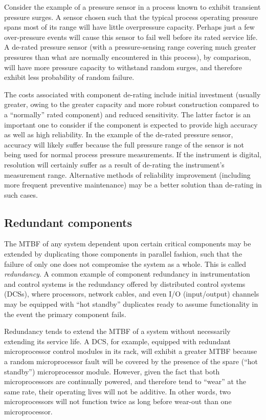 Consider the example of a pressure sensor in a process known to exhibit transient pressure surges.  A sensor chosen such that the typical process operating pressure spans most of its range will have little overpressure capacity.  Perhaps just a few over-pressure events will cause this sensor to fail well before its rated service life.  A de-rated pressure sensor (with a pressure-sensing range covering much greater pressures than what are normally encountered in this process), by comparison, will have more pressure capacity to withstand random surges, and therefore exhibit less probability of random failure.

The costs associated with component de-rating include initial investment (usually greater, owing to the greater capacity and more robust construction compared to a ``normally'' rated component) and reduced sensitivity.  The latter factor is an important one to consider if the component is expected to provide high accuracy as well as high reliability.  In the example of the de-rated pressure sensor, accuracy will likely suffer because the full pressure range of the sensor is not being used for normal process pressure measurements.  If the instrument is digital, resolution will certainly suffer as a result of de-rating the instrument's measurement range.  Alternative methods of reliability improvement (including more frequent preventive maintenance) may be a better solution than de-rating in such cases.






\filbreak
\subsection{Redundant components}

The MTBF of any system dependent upon certain critical components may be extended by duplicating those components in parallel fashion, such that the failure of only one does not compromise the system as a whole.  This is called \textit{redundancy}.  A common example of component redundancy in instrumentation and control systems is the redundancy offered by distributed control systems (DCSs), where processors, network cables, and even I/O (input/output) channels may be equipped with ``hot standby'' duplicates ready to assume functionality in the event the primary component fails.     

Redundancy tends to extend the MTBF of a system without necessarily extending its service life.  A DCS, for example, equipped with redundant microprocessor control modules in its rack, will exhibit a greater MTBF because a random microprocessor fault will be covered by the presence of the spare (``hot standby'') microprocessor module.  However, given the fact that both microprocessors are continually powered, and therefore tend to ``wear'' at the same rate, their operating lives will not be additive.  In other words, two microprocessors will not function twice as long before wear-out than one microprocessor.

